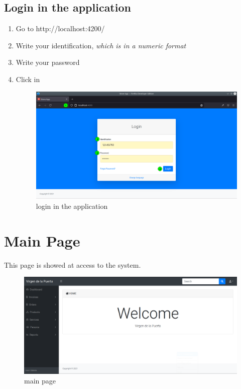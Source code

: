 \documentclass[a4paper,11pt]{refart}
\newcommand\SiteRanqhana{\textsf{http://localhost:4200/}}
\begin{document}
\subsection{Login in the application}\label{section:login_app}
\begin{enumerate}
\item Go to \SiteRanqhana
\item Write your identification, \emph{which is in a numeric format}
\item Write your password
\item Click in 
\begin{figure}[H]\centering
	\includegraphics[width=\textwidth]{images/login}
	\caption{login in the application}
	\label{fig:login}
\end{figure}
\end{enumerate}	

\section{Main Page}\label{section:main_page}
This page is showed at access to the system.
\begin{figure}[H]\centering
	\includegraphics[width=\textwidth]{images/main_page}
	\caption{main page}
	\label{fig:main_page}
\end{figure}
\end{document}

